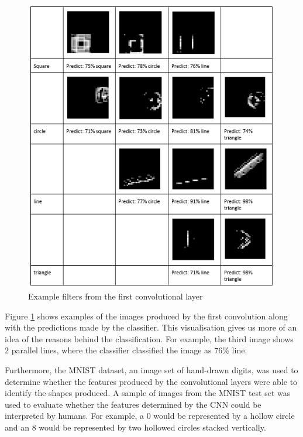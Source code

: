 \begin{figure}
	\begin{center}
		\includegraphics[width=120mm, scale=1]{conv1_pred.png}
		\caption{Example filters from the first convolutional layer}
		\label{fig:conv1_pred}
	\end{center}
	
\end{figure}

Figure \ref{fig:conv1_pred} shows examples of the images produced by the first convolution along with the predictions made by the classifier. This visualisation gives us more of an idea of the reasons behind the classification. For example, the third image shows 2 parallel lines, where the classifier classified the image as 76\% line.

Furthermore, the MNIST dataset, an image set of hand-drawn digits, was used to determine whether the features produced by the convolutional layers were able to identify the shapes produced. A sample of images from the MNIST test set was used to evaluate whether the features determined by the CNN could be interpreted by humans.  For example, a 0 would be represented by a hollow circle and an 8 would be represented by two hollowed circles stacked vertically. 

